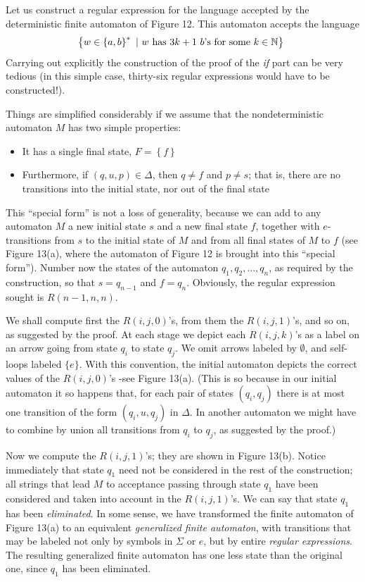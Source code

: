 \begin{examplebreak}{}
  Let us construct a regular expression for the language accepted by the deterministic finite automaton of Figure 12. This automaton accepts the language
  \begin{equation*}
    \left\{ w \in \left\{ a, b \right\}^*\ |\ w \textnormal{ has } 3k+1\ b\textnormal{'s for some } k \in \mathbb{N} \right\}\
  \end{equation*}
  Carrying out explicitly the construction of the proof of the \textit{if} part can be very tedious (in this simple case, thirty-six regular expressions would have to be constructed!).
  
  Things are simplified considerably if we assume that the nondeterministic automaton $M$ has two simple properties:
  \begin{itemize}
    \item It has a single final state, $F = \left\{ f \right\}$
    \item Furthermore, if $(q, u, p) \in \Delta$, then $q \neq f$ and $p \neq s$; that is, there are no transitions into the initial state, nor out of the final state
  \end{itemize}
  This ``special form'' is not a loss of generality, because we can add to any automaton $M$ a new initial state $s$ and a new final state $f$, together with $e$-transitions from $s$ to the initial state of $M$ and from all final states of $M$ to $f$ (see Figure 13(a), where the automaton of Figure 12 is brought into this ``special form''). Number now the states of the automaton $q_1, q_2, ..., q_n$, as required by the construction, so that $s = q_{n-1}$ and $f = q_n$. Obviously, the regular expression sought is $R(n - 1, n, n)$.

  \quad We shall compute first the $R(i, j, 0)$'s, from them the $R(i, j, 1)$'s, and so on, as suggested by the proof. At each stage we depict each $R(i, j, k)$'s as a label on an arrow going from state $q_i$ to state $q_j$. We omit arrows labeled by $\emptyset$, and self-loops labeled $\{e\}$. With this convention, the initial automaton depicts the correct values of the $R(i, j, 0)$'s -see Figure 13(a). (This is so because in our initial automaton it so happens that, for each pair of states $(q_i, q_j)$ there is at most one transition of the form $(q_i, u, q_j)$ in $\Delta$. In another automaton we might have to combine by union all transitions from $q_i$ to $q_j$, as suggested by the proof.)

  \quad Now we compute the $R(i, j, 1)$'s; they are shown in Figure 13(b). Notice immediately that state $q_1$ need not be considered in the rest of the construction; all strings that lead $M$ to acceptance passing through state $q_1$ have been considered and taken into account in the $R(i, j, 1)$'s. We can say that state $q_1$ has been \textit{eliminated}. In some sense, we have transformed the finite automaton of Figure 13(a) to an equivalent \textit{generalized finite automaton}, with transitions that may be labeled not only by symbols in $\Sigma$ or $e$, but by entire \textit{regular expressions}. The resulting generalized finite automaton has one less state than the original one, since $q_1$ has been eliminated.


\end{examplebreak}
